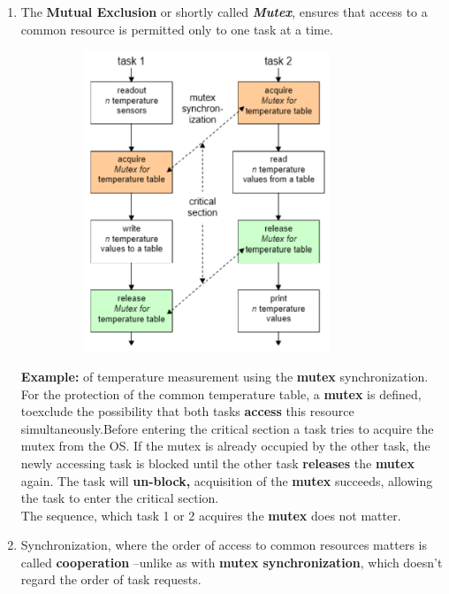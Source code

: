 \begin{enumerate}

\item The \textbf{Mutual Exclusion }or shortly called \textbf{\textit{Mutex}}, ensures that access to a common resource is permitted only to one task at a time. 

 	\begin{figure}[h]
    \centering
    \includegraphics[width=9cm, height=9cm]{Images/image103.png}
    \label{fig:Fig }
    \end{figure}

\textbf{Example:} of temperature measurement using the \textbf{mutex} synchronization.\\

\textbf{ }For the protection of the common temperature table, a \textbf{mutex} is defined, toexclude the possibility that both tasks \textbf{access} this resource simultaneously.Before entering the critical section a task tries to acquire the mutex from the OS. If the mutex is already occupied by the other task, the newly accessing task is blocked\textbf{\textit{ }}until the other task \textbf{releases} the \textbf{mutex} again. The task will \textbf{un-block,} acquisition of the \textbf{mutex} succeeds, allowing the task to enter the critical section.\\

The sequence, which task 1 or 2 acquires the \textbf{mutex} does not matter.\\
\newpage

\item Synchronization, where the order of access to common resources matters is called \textbf{cooperation} --unlike as with\textbf{ mutex synchronization}, which doesn't regard the order of task requests.


\end{enumerate}
